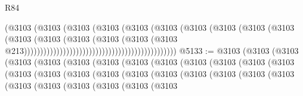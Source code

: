 \begin{lexlean}{R84}
\begin{coremodule}
                                                                  (@3103
                                                                    (@3103
                                                                      (@3103
                                                                        (@3103
                                                                          (@3103
                                                                            (@3103
                                                                              (@3103
                                                                                (@3103
                                                                                  (@3103
                                                                                    (@3103
                                                                                      (@3103
                                                                                        (@3103
                                                                                          (@3103
                                                                                            (@3103
                                                                                              (@3103
                                                                                                (@3103
                                                                                                  @213)))))))))))))))))))))))))))))))))))))))))))))))
@5133 := @3103
    (@3103
      (@3103
        (@3103
          (@3103
            (@3103
              (@3103
                (@3103
                  (@3103
                    (@3103
                      (@3103
                        (@3103
                          (@3103
                            (@3103
                              (@3103
                                (@3103
                                  (@3103
                                    (@3103
                                      (@3103
                                        (@3103
                                          (@3103
                                            (@3103
                                              (@3103
                                                (@3103
                                                  (@3103
                                                    (@3103
                                                      (@3103
                                                        (@3103
                                                          (@3103

\end{coremodule}
\end{lexlean}
